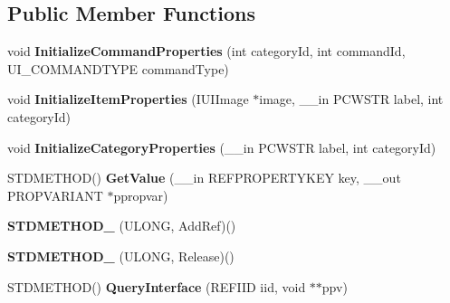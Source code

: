 \subsection*{Public Member Functions}
\begin{DoxyCompactItemize}
\item 
\hypertarget{class_c_property_set_a88e3aa4829e6f8a218488471382f2c0d}{void {\bfseries Initialize\-Command\-Properties} (int category\-Id, int command\-Id, U\-I\-\_\-\-C\-O\-M\-M\-A\-N\-D\-T\-Y\-P\-E command\-Type)}\label{class_c_property_set_a88e3aa4829e6f8a218488471382f2c0d}

\item 
\hypertarget{class_c_property_set_a3ec8e571945b29270d7eba5b653e18ac}{void {\bfseries Initialize\-Item\-Properties} (I\-U\-I\-Image $\ast$image, \-\_\-\-\_\-in P\-C\-W\-S\-T\-R label, int category\-Id)}\label{class_c_property_set_a3ec8e571945b29270d7eba5b653e18ac}

\item 
\hypertarget{class_c_property_set_a3eafcb9763909a26ab756d1028df83e4}{void {\bfseries Initialize\-Category\-Properties} (\-\_\-\-\_\-in P\-C\-W\-S\-T\-R label, int category\-Id)}\label{class_c_property_set_a3eafcb9763909a26ab756d1028df83e4}

\item 
\hypertarget{class_c_property_set_a56015a705d3c8137304a727be0de3b02}{S\-T\-D\-M\-E\-T\-H\-O\-D() {\bfseries Get\-Value} (\-\_\-\-\_\-in R\-E\-F\-P\-R\-O\-P\-E\-R\-T\-Y\-K\-E\-Y key, \-\_\-\-\_\-out P\-R\-O\-P\-V\-A\-R\-I\-A\-N\-T $\ast$ppropvar)}\label{class_c_property_set_a56015a705d3c8137304a727be0de3b02}

\item 
\hypertarget{class_c_property_set_a63033c80c286a1b29ee74429e3fe3769}{{\bfseries S\-T\-D\-M\-E\-T\-H\-O\-D\-\_\-} (U\-L\-O\-N\-G, Add\-Ref)()}\label{class_c_property_set_a63033c80c286a1b29ee74429e3fe3769}

\item 
\hypertarget{class_c_property_set_a719cb007f947586300699305ba95d0e7}{{\bfseries S\-T\-D\-M\-E\-T\-H\-O\-D\-\_\-} (U\-L\-O\-N\-G, Release)()}\label{class_c_property_set_a719cb007f947586300699305ba95d0e7}

\item 
\hypertarget{class_c_property_set_a4eec3cf79b6bfc761496bc162519770a}{S\-T\-D\-M\-E\-T\-H\-O\-D() {\bfseries Query\-Interface} (R\-E\-F\-I\-I\-D iid, void $\ast$$\ast$ppv)}\label{class_c_property_set_a4eec3cf79b6bfc761496bc162519770a}

\end{DoxyCompactItemize}
